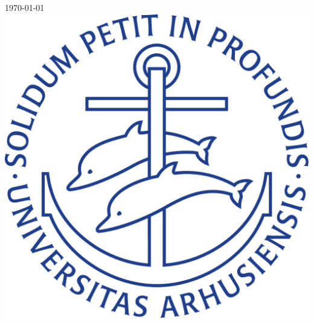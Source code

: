 \documentclass[12pt]{article}
\begin{document}
\begin{titlepage}
\vfill\vfill\vfill
{\large \today}\\[2cm] %

\vfill
\includegraphics[width=0.35\columnwidth]{../figures/ausegl_blaa-eps-converted-to.pdf}\\[1cm] %
 

\vfill %
\end{titlepage}
\end{document}
